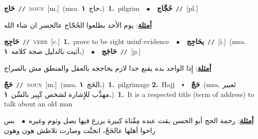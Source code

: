 \documentclass[10pt,a4paper,twoside]{article} %
\begin{document}
\begin{multicols}{2}
{{{{{{{{{{{\setlength\topsep{0pt}\textbf{\foreignlanguage{arabic}{حَاج}}\ {\color{gray}\texttt{//}\color{black}}\ \textsc{noun}\ [m.]\ \color{gray}(msa. \foreignlanguage{arabic}{حاج}~\foreignlanguage{arabic}{\textbf{١.}})\color{black}\ \textbf{1.}~pilgrim\ \ $\bullet$\ \ \setlength\topsep{0pt}\textbf{\foreignlanguage{arabic}{حُجَّاج}}\ {\color{gray}\texttt{//}\color{black}}\ [pl.]\  \begin{flushright}\color{gray}\foreignlanguage{arabic}{\textbf{\underline{\foreignlanguage{arabic}{أمثلة}}}: يوم الأحد بطلعوا الحُجّاج عالجسر ان شاء الله}\end{flushright}\color{black}} \vspace{2mm}

{\setlength\topsep{0pt}\textbf{\foreignlanguage{arabic}{حَاجِج}}\ {\color{gray}\texttt{//}\color{black}}\ \textsc{verb}\ [c.]\ \textbf{1.}~prove to be right usinf evidence\ \ $\bullet$\ \ \setlength\topsep{0pt}\textbf{\foreignlanguage{arabic}{يحَاجِج}}\ {\color{gray}\texttt{//}\color{black}}\ [i.]\ \color{gray}(msa. \foreignlanguage{arabic}{أثبت بالدليل صحة كلامه}~\foreignlanguage{arabic}{\textbf{١.}})\color{black}\ \ $\bullet$\ \ \setlength\topsep{0pt}\textbf{\foreignlanguage{arabic}{حَاجَج}}\ {\color{gray}\texttt{//}\color{black}}\ [p.]\  \begin{flushright}\color{gray}\foreignlanguage{arabic}{\textbf{\underline{\foreignlanguage{arabic}{أمثلة}}}: إِذا الواحد بده يقنع حدا لازم يحاججه بالعقل والمنطق مش بالصراخ}\end{flushright}\color{black}} \vspace{2mm}

{\setlength\topsep{0pt}\textbf{\foreignlanguage{arabic}{حَجّ}}\ {\color{gray}\texttt{//}\color{black}}\ \textsc{noun}\ [m.]\ \color{gray}(msa. \foreignlanguage{arabic}{الحَج}~\foreignlanguage{arabic}{\textbf{١.}})\color{black}\ \textbf{1.}~pilgrimage  \textbf{2.}~Hajj\ \ $\smblkdiamond$\ \ \setlength\topsep{0pt}\textbf{\foreignlanguage{arabic}{حَجّ}}\ \color{gray}(msa. \foreignlanguage{arabic}{تَعبير مهذَّب للإِشارة لشخص كَبِير بالسِّن}~\foreignlanguage{arabic}{\textbf{١.}})\color{black}\ \textbf{1.}~It is a respected title (term of address) to talk about an old man\  \begin{flushright}\color{gray}\foreignlanguage{arabic}{\textbf{\underline{\foreignlanguage{arabic}{أمثلة}}}: رحمة الحج أبو الحسن بقت عنده مِقْثاة كبيرة يزرع فيها بصل وثوم وغيره\ $\bullet$\ \  بس راحوا أهلها عالحَجْ، انجنَّت وصارت تلاطش هون وهون}\end{flushright}\color{black}} \vspace{2mm}

}}}}}}}}}}
\end{multicols}
\end{document}
